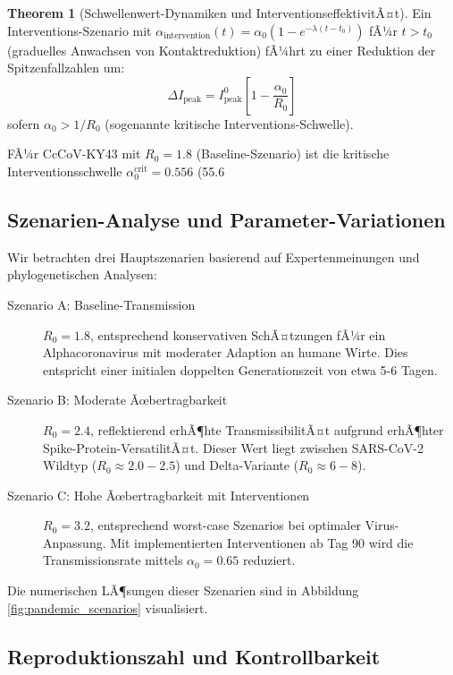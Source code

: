 ﻿\documentclass[11pt,a4paper]{article}
\theoremstyle{definition}
\newtheorem{theorem}{Theorem}[section]
\begin{document}
\begin{theorem}[Schwellenwert-Dynamiken und InterventionseffektivitÃ¤t]
\label{thm:intervention_threshold}
Ein Interventions-Szenario mit $\alpha_{\text{intervention}}(t) = \alpha_0 (1 - e^{-\lambda(t - t_0)})$ fÃ¼r $t > t_0$ (graduelles Anwachsen von Kontaktreduktion) fÃ¼hrt zu einer Reduktion der Spitzenfallzahlen um:
\[
\Delta I_{\text{peak}} = I_{\text{peak}}^{0} \left[1 - \frac{\alpha_0}{R_0}\right]
\]
sofern $\alpha_0 > 1/R_0$ (sogenannte kritische Interventions-Schwelle).

FÃ¼r CcCoV-KY43 mit $R_0 = 1.8$ (Baseline-Szenario) ist die kritische Interventionsschwelle $\alpha_0^{\text{crit}} = 0.556$ (55.6%
\end{theorem}

\subsection{Szenarien-Analyse und Parameter-Variationen}

Wir betrachten drei Hauptszenarien basierend auf Expertenmeinungen und phylogenetischen Analysen:

\begin{description}
\item[Szenario A: Baseline-Transmission] $R_0 = 1.8$, entsprechend konservativen SchÃ¤tzungen fÃ¼r ein Alphacoronavirus mit moderater Adaption an humane Wirte. Dies entspricht einer initialen doppelten Generationszeit von etwa 5-6 Tagen.

\item[Szenario B: Moderate Ãœbertragbarkeit] $R_0 = 2.4$, reflektierend erhÃ¶hte TransmissibilitÃ¤t aufgrund erhÃ¶hter Spike-Protein-VersatilitÃ¤t. Dieser Wert liegt zwischen SARS-CoV-2 Wildtyp ($R_0 \approx 2.0-2.5$) und Delta-Variante ($R_0 \approx 6-8$).

\item[Szenario C: Hohe Ãœbertragbarkeit mit Interventionen] $R_0 = 3.2$, entsprechend worst-case Szenarios bei optimaler Virus-Anpassung. Mit implementierten Interventionen ab Tag 90 wird die Transmissionsrate mittels $\alpha_0 = 0.65$ reduziert.
\end{description}

Die numerischen LÃ¶sungen dieser Szenarien sind in Abbildung \ref{fig:pandemic_scenarios} visualisiert.

\subsection{Reproduktionszahl und Kontrollbarkeit}
\end{document}
